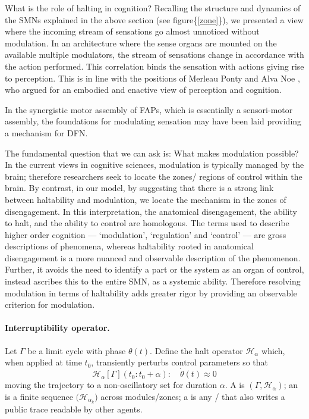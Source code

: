 What is the role of halting in cognition?
Recalling the structure and dynamics of the SMNs explained in the above section (see figure\{\ref{zone}\}), we presented a view where the incoming stream of sensations go almost unnoticed without modulation. In an architecture where the sense organs are mounted on the available multiple modulators, the stream of sensations change in accordance with the action performed. This correlation binds the sensation with actions giving rise to perception. This is in line with the positions of Merleau Ponty \cite{ponty1969phenomenology} and Alva Noe \cite{noe_action_2004}, who argued for an embodied and enactive view of perception and cognition. 

In the synergistic motor assembly of FAPs, which is essentially a sensori-motor assembly, the foundations for modulating sensation may have been laid providing a mechanism for DFN. 

The fundamental question that we can ask is: What makes modulation possible? In the current views in cognitive sciences, modulation is typically managed by the brain; therefore researchers seek to locate the zones/ regions of control within the brain. By contrast, in our model, by suggesting that there is a strong link between haltability and modulation, we locate the mechanism in the zones of disengagement. In this interpretation, the anatomical disengagement, the ability to halt, and the ability to control are homologous. The terms used to describe higher order cognition --- `modulation', `regulation' and `control' --- are gross descriptions of phenomena, whereas haltability rooted in anatomical disengagement is a more nuanced and observable description of the phenomenon. Further, it avoids the need to identify a part or the system as an organ of control, instead ascribes this to the entire SMN, as a systemic ability. Therefore resolving modulation in terms of haltability adds greater rigor by providing an observable criterion for modulation. 


\paragraph{Interruptibility operator.}\label{interrupt-operator}
Let $\Gamma$ be a \FAP{} limit cycle with phase $\theta(t)$.
Define the halt operator $\mathcal{H}_{\alpha}$ which, when applied at time $t_0$, transiently perturbs control parameters so that
\[
\mathcal{H}_{\alpha}[\Gamma](t_0\!:\!t_0{+}\alpha):\quad \dot\theta(t)\approx 0
\]
moving the trajectory to a non-oscillatory set for duration $\alpha$. 
A \HAP{} is $(\Gamma,\mathcal{H}_\alpha)$; an \OAP{} is a finite sequence $\big(\mathcal{H}_{\alpha_k}\big)$ across modules/zones; a \TAP{} is any \HAP{}/\OAP{} that also writes a public trace readable by other agents.





